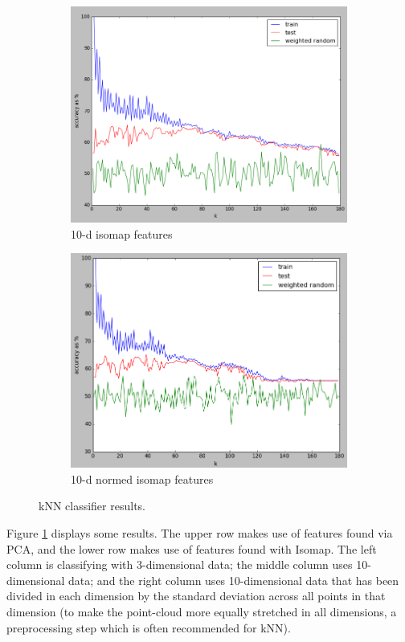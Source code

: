 \documentclass[]{article}
\begin{document}
\begin{figure}[H]
\begin{subfigure}{.32\textwidth}
      \includegraphics[width=1\linewidth]{10isos.png}
      \caption{10-d isomap features}
    \end{subfigure}
    \begin{subfigure}{.33\textwidth}
      \centering
      \includegraphics[width=1\linewidth]{10isosnorm.png}
      \caption{10-d normed isomap features}
    \end{subfigure}
    \caption{kNN classifier results.}
    \label{fig:classify}
  \end{figure}

  Figure \ref{fig:classify} displays some results. The upper row makes use of features found via PCA, and the lower row makes use of features found with Isomap. The left column is classifying with 3-dimensional data; the middle column uses 10-dimensional data; and the right column uses 10-dimensional data that has been divided in each dimension by the standard deviation across all points in that dimension (to make the point-cloud more equally stretched in all dimensions, a preprocessing step which is often recommended for kNN).
\end{document}
